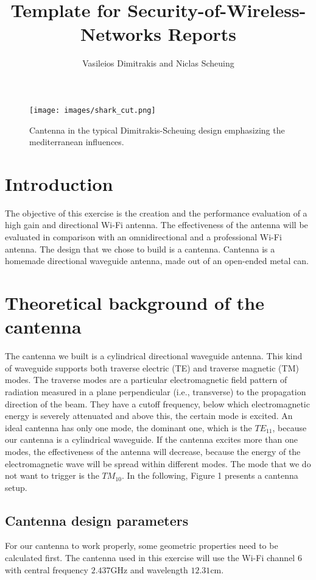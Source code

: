 \documentclass[12pt,a4paper]{article}
\title{Template for Security-of-Wireless-Networks Reports}
\author{Vasileios Dimitrakis and Niclas Scheuing}
\begin{document}
\maketitle
\begin{figure}[h]
	\texttt{[image: images/shark\_cut.png]}
	\caption{Cantenna in the typical Dimitrakis-Scheuing design emphasizing the mediterranean influences.}
	\label{shark}
\end{figure}
\pagebreak
\section{Introduction}
	The objective of this exercise is the creation and the performance evaluation of a high gain
	and directional Wi-Fi antenna. The effectiveness of the antenna will be evaluated in comparison with an omnidirectional and a professional Wi-Fi antenna. The design that we chose to build is a cantenna. Cantenna is a homemade directional waveguide antenna, made out of an open-ended metal can.

\section{Theoretical background of the cantenna}
	The cantenna we built is a cylindrical directional waveguide antenna. This kind of waveguide supports both traverse electric (TE) and traverse magnetic (TM) modes. The traverse modes are a particular electromagnetic field pattern of radiation measured in a plane perpendicular (i.e., transverse) to the propagation direction of the beam. They have a cutoff frequency, below which electromagnetic energy is severely attenuated and above this, the certain mode is excited. An ideal cantenna has only one mode, the dominant one, which is the $TE_{11}$, because our cantenna is a cylindrical waveguide. If the cantenna excites more than one modes, the effectiveness of the antenna will decrease, because the energy of the electromagnetic wave will be spread within different modes. The mode that we do not want to trigger is the $TM_{10}$.
	In the following, Figure 1 presents a cantenna setup.
	
	
	\subsection{Cantenna design parameters}
		For our cantenna to work properly, some geometric properties need to be calculated first.
		The cantenna used in this exercise will use the Wi-Fi channel $6$ with central frequency $2.437$GHz and wavelength $12.31$cm.
		
\end{document}
